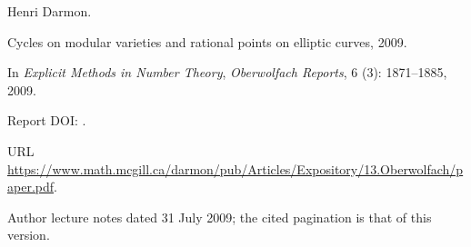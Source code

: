 Henri Darmon.

\newblock Cycles on modular varieties and rational points on elliptic curves,
  2009.

\newblock In \emph{Explicit Methods in Number Theory}, \emph{Oberwolfach
  Reports}, 6 (3): 1871--1885, 2009.

\newblock Report DOI: .

\newblock URL
  \url{https://www.math.mcgill.ca/darmon/pub/Articles/Expository/13.Oberwolfach/paper.pdf}.

\newblock Author lecture notes dated 31 July 2009; the cited pagination is that of this version.
